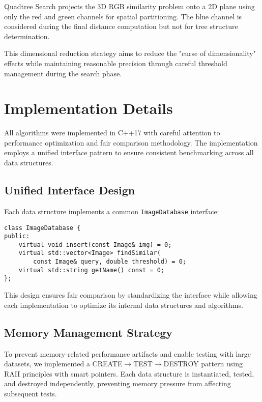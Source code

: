 \documentclass{sbc2023}
\begin{document}
Quadtree Search projects the 3D RGB similarity problem onto a 2D plane using only the red and green channels for spatial partitioning. The blue channel is considered during the final distance computation but not for tree structure determination.

This dimensional reduction strategy aims to reduce the "curse of dimensionality" effects while maintaining reasonable precision through careful threshold management during the search phase.

\section{Implementation Details}
\label{sec:implementation}

All algorithms were implemented in C++17 with careful attention to performance optimization and fair comparison methodology. The implementation employs a unified interface pattern to ensure consistent benchmarking across all data structures.

\subsection{Unified Interface Design}

Each data structure implements a common \texttt{ImageDatabase} interface:

\begin{verbatim}
class ImageDatabase {
public:
    virtual void insert(const Image& img) = 0;
    virtual std::vector<Image> findSimilar(
        const Image& query, double threshold) = 0;
    virtual std::string getName() const = 0;
};
\end{verbatim}

This design ensures fair comparison by standardizing the interface while allowing each implementation to optimize its internal data structures and algorithms.

\subsection{Memory Management Strategy}

To prevent memory-related performance artifacts and enable testing with large datasets, we implemented a CREATE$\rightarrow$TEST$\rightarrow$DESTROY pattern using RAII principles with smart pointers. Each data structure is instantiated, tested, and destroyed independently, preventing memory pressure from affecting subsequent tests.
\end{document}
